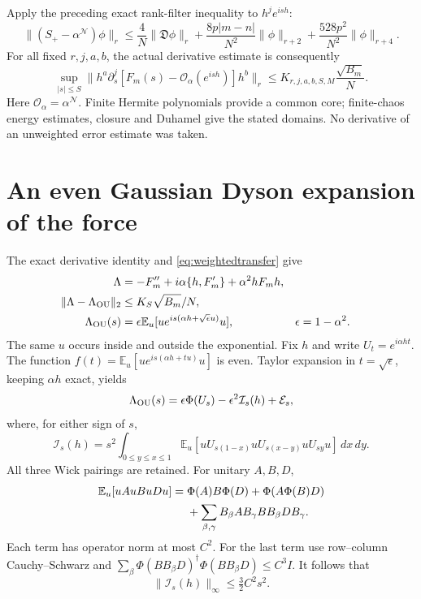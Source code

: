 \documentclass[11pt,a4paper]{article}
\newcommand{\EE}{\mathbb E}
\newcommand{\NN}{\mathcal N}
\newcommand{\DD}{\mathfrak D}
\begin{document}
Apply the preceding exact rank-filter inequality to $h^je^{ish}$:
\begin{equation}
 \|(S_+-\alpha^{\NN})\phi\|_r\le
 \frac4N\|\DD\phi\|_r+
 \frac{8p|m-n|}{N^2}\|\phi\|_{r+2}+
 \frac{528p^2}{N^2}\|\phi\|_{r+4}.
\end{equation}
For all fixed $r,j,a,b$, the actual derivative estimate is consequently
\begin{equation}
 \boxed{\quad
 \sup_{|s|\le S}\|h^a\partial_s^j[F_m(s)-\mathcal O_\alpha(e^{ish})]h^b\|_r
 \le K_{r,j,a,b,S,M}\frac{\sqrt{B_m}}N.\quad}
 \label{eq:weightedtransfer}
\end{equation}
Here $\mathcal O_\alpha=\alpha^{\NN}$. Finite Hermite polynomials
provide a common core; finite-chaos energy estimates, closure and
Duhamel give the stated domains. No derivative of an unweighted
error estimate was taken.

\newpage
\section{An even Gaussian Dyson expansion of the force}
The exact derivative identity and \eqref{eq:weightedtransfer} give
\begin{align}
 \Lambda&=-F_m''+i\alpha\{h,F_m'\}+\alpha^2hF_mh,\\
 \|\Lambda-\Lambda_{\rm OU}\|_2&\le K_S\sqrt{B_m}/N,\label{eq:forceerror}\\
 \Lambda_{\rm OU}(s)&=\epsilon\EE_u[u e^{is(\alpha h+\sqrt\epsilon u)}u],
 &\epsilon&=1-\alpha^2.
\end{align}
The same $u$ occurs inside and outside the exponential. Fix $h$ and
write $U_t=e^{i\alpha ht}$. The function
$f(t)=\EE_u[u e^{is(\alpha h+tu)}u]$ is even. Taylor expansion in
$t=\sqrt\epsilon$, keeping $\alpha h$ exact, yields
\begin{equation}
 \Lambda_{\rm OU}(s)=\epsilon\Phi(U_s)-\epsilon^2\mathcal I_s(h)
                       +\mathcal E_s,
 \label{eq:dyson}
\end{equation}
where, for either sign of $s$,
\begin{equation}
 \mathcal I_s(h)=s^2\int_{0\le y\le x\le1}
 \EE_u[uU_{s(1-x)}uU_{s(x-y)}uU_{sy}u]\,dx\,dy.
\end{equation}
All three Wick pairings are retained. For unitary $A,B,D$,
\begin{align}
 \EE_u[uAuBuDu]
 ={}&\Phi(A)B\Phi(D)+\Phi(A\Phi(B)D)\notag\\
 &+\sum_{\beta,\gamma}B_\beta A B_\gamma B B_\beta D B_\gamma.
\end{align}
Each term has operator norm at most $C^2$. For the last term use
row--column Cauchy--Schwarz and
$\sum_\beta\Phi(BB_\beta D)^\dagger\Phi(BB_\beta D)\le C^3I$.
It follows that
\begin{equation}
 \|\mathcal I_s(h)\|_\infty\le\tfrac32 C^2s^2.
\end{equation}
\end{document}
